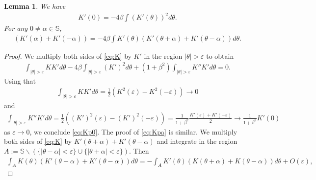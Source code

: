 \documentclass[10pt]{article}
\newtheorem{lemma}[theorem]{Lemma}
\theoremstyle{definition}
\theoremstyle{remark}
\numberwithin{equation}{section}
\newcommand{\0}{\emptyset}
\newcommand{\alp}{\alpha}
\newcommand{\bt}{\beta}
\newcommand{\tht}{\theta}
\newcommand{\bbS}{\mathbb S}
\begin{document}
	\begin{lemma} We have 
		\begin{equation}\label{eq:Kp0}
			\begin{split}
				K'(0) = - 4\bt \int (K'(\tht))^2 d\tht. 
			\end{split}
		\end{equation} For any $0 \ne \alp \in \bbS$, \begin{equation}\label{eq:Kpa}
			\begin{split}
				\left( K'(\alp) + K'(-\alp) \right)= -4\bt \int K'(\tht) \left( K'(\tht+\alp) + K'(\tht-\alp) \right) d\tht. 
			\end{split}
		\end{equation}
	\end{lemma}
	\begin{proof}
		We multiply both sides of \eqref{eq:K} by $K'$ in the region $|\tht|>\varepsilon$ to obtain \begin{equation*}
			\begin{split}
				\int_{ |\tht |>\varepsilon} KK' d\tht - 4\bt \int_{ |\tht |>\varepsilon} (K')^2d\tht + (1+\bt^2) \int_{ |\tht |>\varepsilon} K''K' d\tht = 0. 
			\end{split}
		\end{equation*} Using that \begin{equation*}
			\begin{split}
				\int_{ |\tht |>\varepsilon} KK' d\tht = \frac12 \left( K^2(\varepsilon)-K^2(-\varepsilon) \right) \to 0
			\end{split}
		\end{equation*} and \begin{equation*}
			\begin{split}
				\int_{ |\tht |>\varepsilon} K''K' d\tht = \frac12 \left(  (K')^2(\varepsilon) - (K')^2(-\varepsilon) \right) = \frac{1}{1+\bt^2} \frac{ K'(\varepsilon) + K'(-\varepsilon) }{2} \to \frac{1}{1+\bt^2} K'(0)
			\end{split}
		\end{equation*} as $\varepsilon\to0$, we conclude \eqref{eq:Kp0}. The proof of \eqref{eq:Kpa} is similar. We multiply both sides of \eqref{eq:K} by $K'(\tht+\alp)+K'(\tht-\alp)$ and integrate in the region $A:= \bbS\backslash ( \{ |\tht-\alp|<\varepsilon \} \cup \{ |\tht+\alp|<\varepsilon \} )$. Then \begin{equation*}
			\begin{split}
				\int_A K(\tht) (K'(\tht+\alp)+K'(\tht-\alp)) d\tht  = -\int_A K'(\tht) ( K(\tht+\alp) + K(\tht-\alp) ) d\tht + O(\varepsilon),

\end{split}
\end{equation*}
\end{proof}
\end{document}
